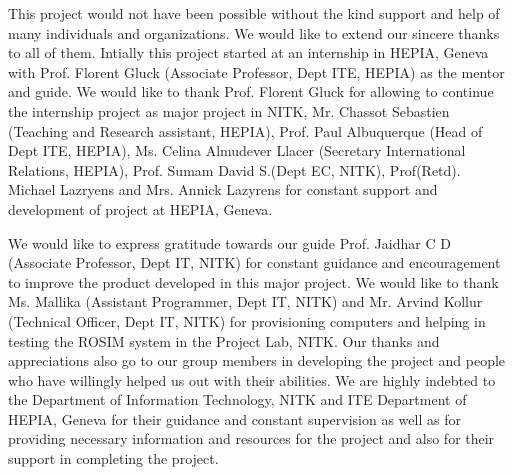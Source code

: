 \documentclass[a4paper,12pt]{article}
\begin{document}
This project would not have been possible without the kind support and help of many
individuals and organizations. We would like to extend our sincere thanks to all of them. Intially this project started at an internship in HEPIA, Geneva  with Prof. Florent Gluck (Associate Professor, Dept ITE, HEPIA) as the mentor and guide. We would like to thank Prof. Florent Gluck for allowing to continue the internship project as major project in NITK, Mr. Chassot Sebastien (Teaching and Research assistant, HEPIA), Prof. Paul Albuquerque (Head of Dept ITE, HEPIA), Ms. Celina Almudever Llacer (Secretary International Relations, HEPIA), Prof. Sumam David S.(Dept EC, NITK), Prof(Retd). Michael Lazryens and Mrs. Annick Lazyrens for constant support and development of project at HEPIA, Geneva.

We would like to express gratitude towards our guide Prof. Jaidhar C D (Associate Professor, Dept IT, NITK) for constant guidance and encouragement to improve the product developed in this major project. We would like to thank Ms. Mallika (Assistant Programmer, Dept IT, NITK) and Mr. Arvind Kollur (Technical Officer, Dept IT, NITK) for  provisioning computers and helping in testing the ROSIM system in the Project Lab, NITK. Our thanks and appreciations also go to our group members in developing the project and people who have willingly helped us out with their abilities. We are highly indebted to the Department of Information Technology, NITK  and ITE Department of HEPIA, Geneva for their guidance and constant supervision as well as for providing necessary information and resources for the project and also for their support in completing the project.
\newpage
\end{document}
